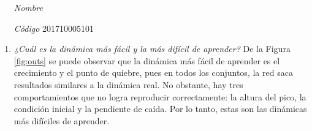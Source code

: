 \documentclass[fleqn]{article}
\begin{document}
 \vspace{0.3cm}
   \begin{itemize}[leftmargin=6.25cm, labelsep=0.5cm]

     \item[\textit{Nombre}]  %
     \item[\textit{Código}] 201710005101 %

   \end{itemize}
\vspace{0.3cm}

\begin{enumerate}
    \item \textit{¿Cuál es la dinámica más fácil y la más difícil de aprender?}
    De la Figura \ref{fig:outs} se puede observar que la dinámica más fácil de aprender es el crecimiento y el punto de quiebre, pues en todos los conjuntos, la red saca resultados similares a la dinámica real. No obstante, hay tres comportamientos que no logra reproducir correctamente: la altura del pico, la condición inicial y la pendiente de caída. Por lo tanto, estas son las dinámicas más difíciles de aprender.
    

\end{enumerate}
\end{document}
